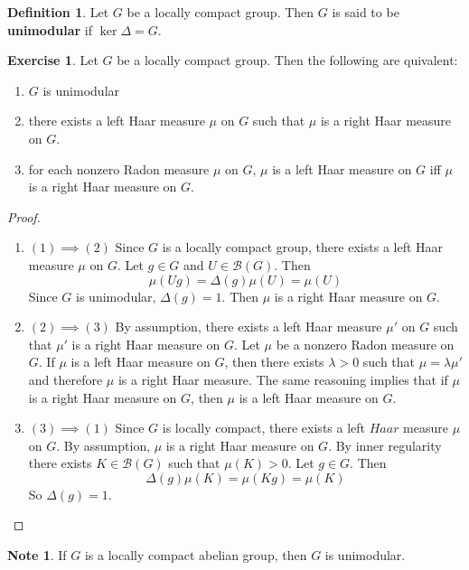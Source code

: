 \documentclass[12pt]{amsart}
\theoremstyle{definition}
\newtheorem{defn}[definition]{Definition}
\newtheorem{note}[definition]{Note}
\newtheorem{ex}[definition]{Exercise}
\newcommand{\Del}{\Delta}
\newcommand{\lam}{\lambda}
\newcommand{\MB}{\mathcal{B}}
\begin{document}
	\begin{defn}
		Let $G$ be a locally compact group. Then $G$ is said to be \textbf{unimodular} if $\ker \Del = G$.  
	\end{defn}
	
	\begin{ex}
		Let $G$ be a locally compact group. Then the following are quivalent: 
		\begin{enumerate}
			\item $G$ is unimodular 
			\item there exists a left  Haar measure $\mu$ on $G$ such that $\mu$ is a right Haar measure on $G$.
			\item for each nonzero Radon measure $\mu$ on $G$, $\mu$ is a left Haar measure on $G$ iff $\mu$ is a right Haar measure on $G$.
		\end{enumerate}
	\end{ex}
	
	\begin{proof}\
		\begin{enumerate}
			\item[]$(1) \implies (2)$ Since $G$ is a locally compact group, there exists a left Haar measure $\mu$ on $G$. Let $g \in G$ and $U \in \MB(G)$. Then $$\mu(Ug) = \Del(g) \mu(U) = \mu(U)$$ Since $G$ is unimodular, $\Del(g) = 1$. Then $\mu$ is a right Haar measure on $G$. \vspace{.5cm}
			\item []$(2) \implies (3)$ By assumption, there exists a left  Haar measure $\mu'$ on $G$ such that $\mu'$ is a right Haar measure on $G$. Let $\mu$ be a nonzero Radon measure on $G$. If $\mu$ is a left Haar measure on $G$, then there exists $\lam >0$ such that $\mu = \lam \mu'$ and therefore $\mu$ is a right Haar measure. The same reasoning implies that if $\mu$ is a right Haar measure on $G$, then $\mu$ is a left Haar measure on $G$.
			\item []$(3) \implies (1)$ Since $G$ is locally compact, there exists a left $Haar$ measure $\mu$ on $G$. By assumption, $\mu$ is a right Haar measure on $G$. By inner regularity there exists $K \in \MB(G)$ such that $\mu(K) > 0$. Let $g \in G$. Then $$\Del(g) \mu(K) = \mu(Kg) = \mu(K)$$ So $\Del(g) = 1$.
		\end{enumerate}
	\end{proof}

	\begin{note}
		If $G$ is a locally compact abelian group, then $G$ is unimodular.
	\end{note}
	
\end{document}
